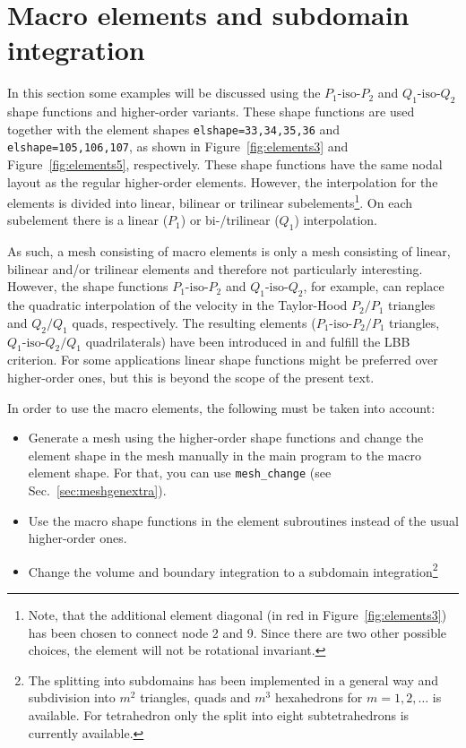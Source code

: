 
\def\headdate{12th November 2021}

\section{Macro elements and subdomain integration}
\label{sec:macroelements}

In this section some examples will be discussed
using the $P_1\text{-iso-}P_2$ and $Q_1\text{-iso-}Q_2$ shape functions and higher-order variants.
These shape functions are used together
with the element shapes \texttt{elshape=33,34,35,36} and \texttt{elshape=105,106,107}, as shown in Figure~\ref{fig:elements3} and Figure~\ref{fig:elements5}, respectively.
These 
shape functions have the same nodal layout as the regular higher-order elements. However, the interpolation for the elements is divided into linear, bilinear or trilinear subelements\footnote{Note, that the additional element diagonal (in red in
Figure~\ref{fig:elements3}) has been chosen to connect node 2 and 9. Since there are two other possible choices, the element will not be rotational invariant.}. On each subelement there is a linear ($P_1$) or bi-/trilinear ($Q_1$) interpolation.

As such, a mesh consisting of macro elements is only a mesh consisting of 
linear, bilinear and/or trilinear elements and therefore not particularly
interesting. However, the shape functions  $P_1\text{-iso-}P_2$ and
$Q_1\text{-iso-}Q_2$, for example, can replace the quadratic interpolation of the velocity
in the Taylor-Hood $P_2/P_1$ triangles and $Q_2/Q_1$ quads, respectively.
The resulting elements ($P_1\text{-iso-}P_2/P_1$ triangles, 
$Q_1\text{-iso-}Q_2/Q_1$ quadrilaterals) have been introduced in
\cite{Bercovier79} and fulfill
the LBB criterion. For some applications linear shape functions might be preferred
over higher-order ones, but this is beyond the scope of the present text.

In order to use the macro elements, the following must be taken into account:
\begin{itemize}
  \item Generate a mesh using the higher-order shape functions and change the
        element shape in the mesh manually in the main program to the
        macro element shape. For that, you can use \texttt{mesh\_change} (see Sec.~\ref{sec:meshgenextra}).
  \item Use the macro shape functions
        in the element subroutines instead of the usual higher-order ones.
  \item Change the volume and boundary integration to a subdomain integration\footnote{The
splitting into subdomains has been implemented in a general way and 
subdivision into $m^2$ triangles, quads and $m^3$ hexahedrons for
$m=1,2,\ldots$ is available. For tetrahedron only the split into eight subtetrahedrons is currently available.}
\end{itemize}

